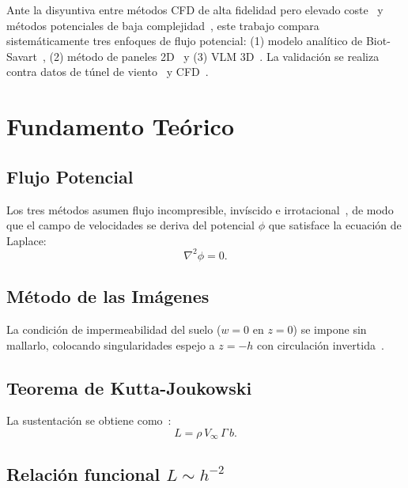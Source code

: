 \documentclass[twocolumn]{article}
\begin{document}
Ante la disyuntiva entre métodos CFD de alta fidelidad pero elevado coste~\cite{raymer2018} y métodos potenciales de baja complejidad~\cite{katz2001}, este trabajo compara sistemáticamente tres enfoques de flujo potencial: (1) modelo analítico de Biot-Savart~\cite{wieselsberger1922}, (2) método de paneles 2D~\cite{hess1967} y (3) VLM 3D~\cite{katz2001}. La validación se realiza contra datos de túnel de viento~\cite{hernandez2012} y CFD~\cite{autodesk2024}.

\section{Fundamento Teórico}

\subsection{Flujo Potencial}

Los tres métodos asumen flujo incompresible, invíscido e irrotacional~\cite{anderson2011}, de modo que el campo de velocidades se deriva del potencial $\phi$ que satisface la ecuación de Laplace:
\begin{equation}
    \nabla^2 \phi = 0.
    \label{eq:laplace}
\end{equation}

\subsection{Método de las Imágenes}

La condición de impermeabilidad del suelo ($w = 0$ en $z=0$) se impone sin mallarlo, colocando singularidades espejo a $z=-h$ con circulación invertida~\cite{katz2001}.

\subsection{Teorema de Kutta-Joukowski}

La sustentación se obtiene como~\cite{prandtl1921}:
\begin{equation}
    L = \rho \, V_{\infty} \, \Gamma \, b.
    \label{eq:kj}
\end{equation}

\subsection{Relación funcional $L \sim h^{-2}$}
\end{document}
